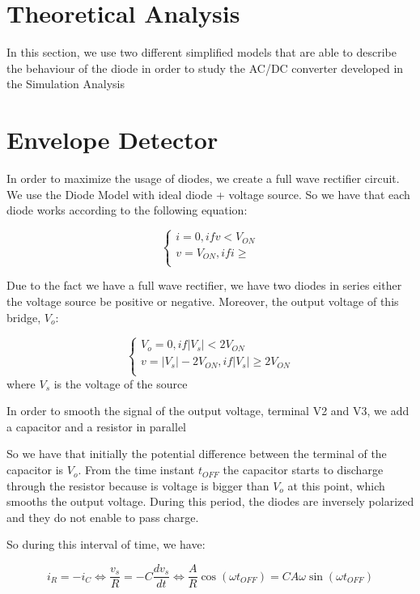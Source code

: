 \section{Theoretical Analysis}
\label{sec:analysis}

In this section, we use two different simplified models that are able to describe the behaviour of the diode
in order to study the AC/DC converter developed in the Simulation Analysis


\section{Envelope Detector}

In order to maximize the usage of diodes, we create a full wave rectifier circuit. We use the Diode Model with ideal diode + voltage source.
So we have that each diode works according to the following equation:


\[
  \left\{
  \begin{array}{ll}
    i = 0, if v < V_{ON}   \\
    v = V_{ON}, if  i \geq \\
  \end{array}
  \right.
\]

Due to the fact we have a full wave rectifier, we have two diodes in series either the voltage source be positive or negative.
Moreover, the output voltage of this bridge, $V_o$:

\[
  \left\{
  \begin{array}{ll}
    V_o = 0,  if  |V_s| < 2V_{ON}               \\
    v = |V_s| - 2 V_{ON}, if |V_s| \geq 2V_{ON} \\
  \end{array}
  \right.
\] where $V_s$ is the voltage of the source

In order to smooth the signal of the output voltage, terminal V2 and V3, we add a capacitor and a resistor in parallel

So we have that initially the potential difference between the terminal of the capacitor is $V_o$. From the time instant $t_{OFF}$
the capacitor starts to discharge through the resistor because is voltage is bigger than $V_o$ at this point, which smooths the output voltage.
During this period, the diodes are inversely polarized and they do not enable to pass charge.

So during this interval of time, we have:

\begin{equation}
  i_R = - i_C \Leftrightarrow \frac{v_s}{R} = -C\frac{dv_s}{dt} \Leftrightarrow \frac{A}{R}\cos(\omega t_{OFF}) = C A \omega \sin(\omega t_{OFF})
\end{equation}

